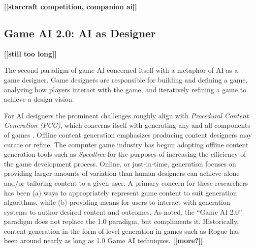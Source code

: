 \documentclass[conference]{IEEEtran}
\newcommand{\mytodo}[1]{\textbf{[[#1]]}}
\begin{document}
\mytodo{starcraft competition, companion ai}


\subsection{Game AI 2.0: AI as Designer}

\mytodo{still too long}

%
The second paradigm of game AI concerned itself with a metaphor of AI as a game designer. 
Game designers are responsible for building and defining a game, analyzing how players interact with the game, and iteratively refining a game to achieve a design vision. 
 
For AI designers the prominent challenges roughly align with {\em Procedural Content Generation (PCG)},
which
concerns itself with generating any and all components of games \cite{hendrikx2013:pcg, togelius2011:sbpcg, yannakakis2012:gameai-revisited}.
%
Offline content generation emphasizes producing content designers may curate or refine.
The computer game industry has begun adopting offline content generation tools such as {\em Speedtree} for the purposes of increasing the efficiency of the game development process. 
Online, or just-in-time, generation focuses on providing larger amounts of variation than human designers can achieve alone and/or tailoring content to a given user.
A primary concern for these researchers has been (a) ways to appropriately represent game content to suit generation algorithms, while (b) providing means for users to interact with generation systems to author desired content and outcomes.
%
As noted, the ``Game AI 2.0'' paradigm does not replace the 1.0 paradigm, but compliments it.
Historically, content generation in the form of level generation in games such as Rogue has been around nearly as long as 1.0 Game AI techniques. \mytodo{more?} 
\end{document}
